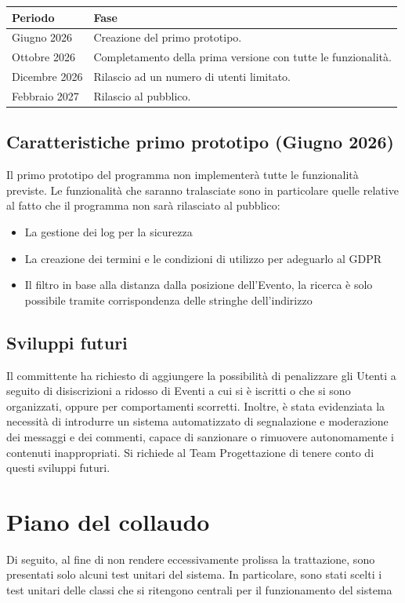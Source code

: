 \documentclass[12pt,a4paper]{report}
\begin{document}
\vspace{0.5cm}
\begin{tabularx}{\textwidth}{|X|X|}
    \hline
    \rowcolor{studyColor} \textbf{Periodo} & \textbf{Fase} \\ \hline
    \endhead
    Giugno 2026 & Creazione del primo prototipo. \\ \hline
    Ottobre 2026 & Completamento della prima versione con tutte le funzionalità. \\ \hline
    Dicembre 2026 & Rilascio ad un numero di utenti limitato. \\ \hline
    Febbraio 2027 & Rilascio al pubblico. \\ \hline
\end{tabularx}

\subsection{Caratteristiche primo prototipo (Giugno 2026)}
Il primo prototipo del programma non implementerà tutte le funzionalità previste. Le funzionalità che saranno tralasciate sono in particolare quelle relative al fatto che il programma non sarà rilasciato al pubblico:
\begin{itemize}
    \item La gestione dei log per la sicurezza
    \item La creazione dei termini e le condizioni di utilizzo per adeguarlo al GDPR
    \item Il filtro in base alla distanza dalla posizione dell'Evento, la ricerca è solo possibile tramite corrispondenza delle stringhe dell'indirizzo
\end{itemize}

\subsection{Sviluppi futuri}
Il committente ha richiesto di aggiungere la possibilità di penalizzare gli Utenti a seguito di disiscrizioni a ridosso di Eventi a cui si è iscritti o che si sono organizzati, oppure per comportamenti scorretti.
Inoltre, è stata evidenziata la necessità di introdurre un sistema automatizzato di segnalazione e moderazione dei messaggi e dei commenti, capace di sanzionare o rimuovere autonomamente i contenuti inappropriati.
Si richiede al Team Progettazione di tenere conto di questi sviluppi futuri.

\newpage
\section{Piano del collaudo}
Di seguito, al fine di non rendere eccessivamente prolissa la trattazione, sono presentati solo alcuni test unitari del sistema.
In particolare, sono stati scelti i test unitari delle classi che si ritengono centrali per il funzionamento del sistema
\end{document}
